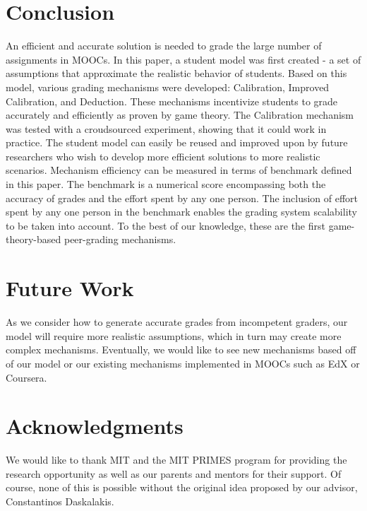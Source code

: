\documentclass{chi-ext}
\begin{document}


\section{Conclusion}
An efficient and accurate solution is needed to grade the large number of assignments in MOOCs. In this paper, a student model was first created - a set of assumptions that approximate the realistic behavior of students. Based on this model, various grading mechanisms were developed: Calibration, Improved Calibration, and Deduction. These mechanisms incentivize students to grade accurately and efficiently as proven by game theory. The Calibration mechanism was tested with a croudsourced experiment, showing that it could work in practice. The student model can easily be reused and improved upon by future researchers who wish to develop more efficient solutions to more realistic scenarios. Mechanism efficiency can be measured in terms of benchmark defined in this paper. The benchmark is a numerical score encompassing both the accuracy of grades and the effort spent by any one person. The inclusion of effort spent by any one person in the benchmark enables the grading system scalability to be taken into account. To the best of our knowledge, these are the first game-theory-based peer-grading mechanisms.

\section{Future Work}
As we consider how to generate accurate grades from incompetent graders, our model will require more realistic assumptions, which in turn may create more complex mechanisms.
Eventually, we would like to see new mechanisms based off of our model or our existing mechanisms implemented in MOOCs such as EdX or Coursera.

\section{Acknowledgments}
We would like to thank MIT and the MIT PRIMES program for providing the research opportunity as well as our parents and mentors for their support. Of course, none of this is possible without the original idea proposed by our advisor, Constantinos Daskalakis.

\balance


\end{document}
